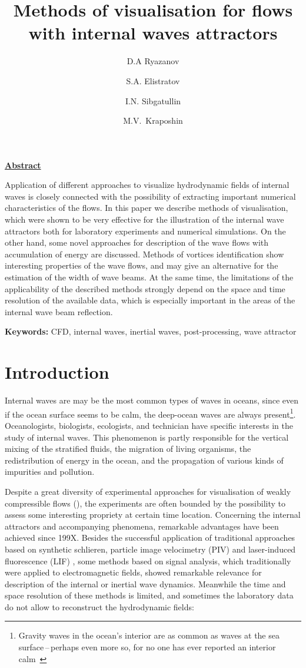 \documentclass[a4wide,fontsize=12pt]{article}
\title{\textbf{Methods of visualisation for flows with internal waves attractors}}
\author[1,A]{D.A Ryazanov}
\author[2,B]{S.A. Elistratov}
\author[3,C]{I.N. Sibgatullin}
\author[4,A]{M.V.~Kraposhin}
\affil[A]{Ivannikov Institute for System Programming of the RAS}
\affil[B]{Lomonosov Moscow State University}
\affil[C]{Shirshov Institute of Oceanology of Russian Academy of Sciences}
\affil[ ]{}
\affil[1]{ORCID: 0000-0001-9568-7121}
\affil[2]{ORCID: 0000-0002-7006-6879}
\affil[3]{ORCID: 0000-0003-2265-3259}
\affil[4]{ORCID: 0000-0001-5730-2702}
\date{}
\begin{document}
\maketitle

\underline{\textbf{Abstract}}

Application of different approaches to visualize hydrodynamic fields of internal waves is closely connected with the possibility of extracting important numerical characteristics of the flows. In this paper we describe methods of visualisation, which were shown to be very effective for the illustration of the internal wave attractors both for laboratory experiments and numerical simulations. On the other hand, some novel approaches for description of the wave flows with accumulation of energy are discussed. Methods of vortices identification show interesting properties of the wave flows, and may give an alternative for the estimation of the width of wave beams. At the same time, the limitations of the applicability of the described methods strongly depend on the space and time resolution of the available data, which is especially important in the areas of the internal wave beam reflection.  

\textbf{Keywords:} CFD, internal waves, inertial waves, post-processing, wave attractor

\section{Introduction}

Internal waves are may be the most common types of waves in oceans, since even if the ocean surface seems to be calm, the deep-ocean waves \cite{1966MunkAbyssalRecipes,Munk1998} are always present\footnote{Gravity waves in the ocean's interior are as common as waves at the sea surface\,--\,perhaps even more so, for no one has ever reported an interior calm~\cite{2005Munk9IW}}. Oceanologists, biologists, ecologists, and technician have specific  interests in the study of internal waves. This phenomenon is partly responsible for the vertical mixing of the stratified fluids, the migration of living organisms, the redistribution of energy in the ocean, and the propagation of various kinds of impurities and pollution.

Despite a great diversity of experimental approaches for visualisation of weakly compressible flows (\cite{znamenskaya2021methods388562176,2014SutherlandDuaxoisPeacockIWinLE}), the experiments are often bounded by the possibility to assess some interesting propriety at certain time location. Concerning the internal attractors and accompanying phenomena, remarkable advantages have been achieved since 199X. Besides the successful application of traditional approaches based on synthetic schlieren, particle image velocimetry (PIV) and laser-induced fluorescence (LIF) , some methods based on signal analysis, which traditionally were applied to electromagnetic fields, showed remarkable relevance for description of the internal or inertial wave dynamics. Meanwhile the time and space resolution of these methods is limited, and sometimes the laboratory data do not allow to reconstruct the hydrodynamic fields: 
\end{document}
